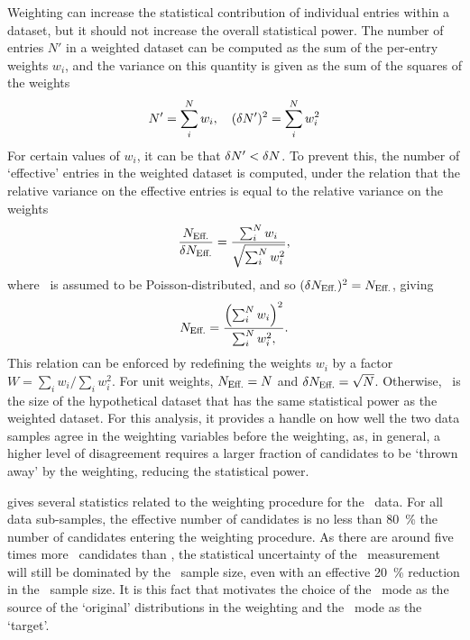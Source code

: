 Weighting can increase the statistical contribution of individual entries
within a dataset, but it should not increase the overall statistical power.
The number of entries $N'$ in a weighted dataset can be computed as the sum of
the per-entry weights $w_{i}$, and the variance on this quantity is given as
the sum of the squares of the weights
\begin{equation}
  N' = \sum_{i}^{N} w_{i},\quad (\delta{N'})^{2} = \sum_{i}^{N} w_{i}^{2}
\end{equation}
For certain values of $w_{i}$, it can be that $\delta{N'} < \delta{N}$.
To prevent this, the number of `effective' entries in the weighted dataset is
computed, under the relation that the relative variance on the effective
entries is equal to the relative variance on the weights
\begin{equation}
  \frac{N_{\text{Eff.}}}{\delta{\ensuremath{N_{\text{Eff.}}}}} =
    \frac{\sum_{i}^{N} w_{i}}{\sqrt{\sum_{i}^{N} w_{i}^{2}}},
\end{equation}
where \neff\ is assumed to be Poisson-distributed, and so $(\delta{\ensuremath{N_{\text{Eff.}}}})^{2} =
N_{\text{Eff.}}$, giving
\begin{equation}
  \neff = \frac{%
    {\left(\sum_{i}^{N}{w_{i}}\right)}^{2}
  }{%
    \sum_{i}^{N}{w_{i}^{2}},
  }.
  \label{eqn:cpv:kinematic_weighting:neff}
\end{equation}
This relation can be enforced by redefining the weights $w_{i}$ by a factor $W
= \sum_{i} w_{i}/\sum_{i} w_{i}^{2}$.
For unit weights, $N_{\text{Eff.}} = N$ and $\delta{\ensuremath{N_{\text{Eff.}}}} = \sqrt{N}$.
Otherwise, \neff\ is the size of the hypothetical dataset that has the same
statistical power as the weighted dataset.
For this analysis, it provides a handle on how well the two data samples agree
in the weighting variables before the weighting, as, in general, a higher level
of disagreement requires a larger fraction of candidates to be `thrown away' by
the weighting, reducing the statistical power.

 gives several statistics
related to the weighting procedure for the \ppipi\ data.
For all data sub-samples, the effective number of candidates is no less than
\SI{80}{\percent} the number of candidates entering the weighting procedure.
As there are around five times more \ppipi\ candidates than \pKK, the
statistical uncertainty of the \dACP\ measurement will still be dominated by
the \pKK\ sample size, even with an effective \SI{20}{\percent} reduction in
the \ppipi\ sample size.
It is this fact that motivates the choice of the \ppipi\ mode as the source of
the `original' distributions in the weighting and the \pKK\ mode as the
`target'.

